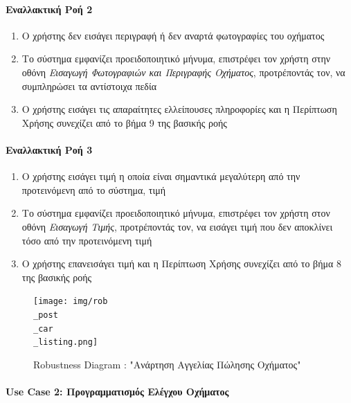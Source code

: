 \documentclass{../ol-softwaremanual}
\begin{document}
	\paragraph{Εναλλακτική Ροή 2}
	
	\begin{enumerate}
		\item Ο χρήστης δεν εισάγει περιγραφή ή δεν αναρτά φωτογραφίες του οχήματος
		\item Το σύστημα εμφανίζει προειδοποιητικό μήνυμα, επιστρέφει τον χρήστη στην οθόνη \textit{Εισαγωγή Φωτογραφιών και Περιγραφής Οχήματος}, προτρέποντάς τον, να συμπληρώσει τα αντίστοιχα πεδία
		\item Ο χρήστης εισάγει τις απαραίτητες ελλείπουσες πληροφορίες και η Περίπτωση Χρήσης συνεχίζει από το βήμα 9 της βασικής ροής
	\end{enumerate}
	
	\paragraph{Εναλλακτική Ροή 3}
	
	\begin{enumerate}
		\item Ο χρήστης εισάγει τιμή η οποία είναι σημαντικά μεγαλύτερη από την προτεινόμενη από το σύστημα, τιμή
		\item Το σύστημα εμφανίζει προειδοποιητικό μήνυμα, επιστρέφει τον χρήστη στον οθόνη \textit{Εισαγωγή Τιμής}, προτρέποντάς τον, να εισάγει τιμή που δεν αποκλίνει τόσο από την προτεινόμενη τιμή
		\item Ο χρήστης επανεισάγει τιμή και η Περίπτωση Χρήσης συνεχίζει από το βήμα 8 της βασικής ροής
	\end{enumerate}

	\begin{figure}[htbp!]
		\texttt{[image: img/rob\\\_post\\\_car\\\_listing.png]}
		\caption{\en Robustness Diagram : "\gr Ανάρτηση Αγγελίας Πώλησης Οχήματος\en"\gr}
	\end{figure}
	


	
	\newpage
	
	
	\paragraph{\en Use Case 2: \gr Προγραμματισμός Ελέγχου Οχήματος} 
	
\end{document}
